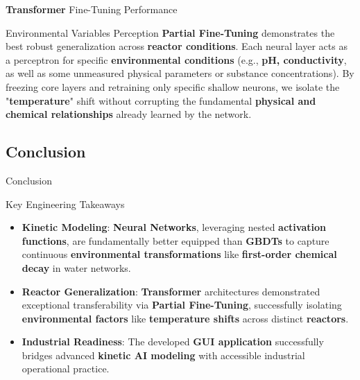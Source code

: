 \documentclass[xcolor=dvipsnames]{beamer}
\begin{document}
\begin{frame}{\textbf{Transformer} Fine-Tuning Performance}
  \footnotesize
  \begin{table}
      \centering
      \caption{MSE of Fine-Tuning Strategies on $35^{\circ}\text{C}$ Datasets}
  \end{table}
  \vspace{-0.3cm}
  \begin{block}{Environmental Variables Perception}
      \footnotesize
      \textbf{Partial Fine-Tuning} demonstrates the best robust generalization across \textbf{reactor conditions}. Each neural layer acts as a perceptron for specific \textbf{environmental conditions} (e.g., \textbf{pH, conductivity}, as well as some unmeasured physical parameters or substance concentrations). By freezing core layers and retraining only specific shallow neurons, we isolate the "\textbf{temperature}" shift without corrupting the fundamental \textbf{physical and chemical relationships} already learned by the network.
  \end{block}
\end{frame}

\subsection{Conclusion}
\begin{frame}{Conclusion}
  \begin{block}{Key Engineering Takeaways}
      \begin{itemize}
          \item \textbf{Kinetic Modeling}: \textbf{Neural Networks}, leveraging nested \textbf{activation functions}, are fundamentally better equipped than \textbf{GBDTs} to capture continuous \textbf{environmental transformations} like \textbf{first-order chemical decay} in water networks.
          \item \textbf{Reactor Generalization}: \textbf{Transformer} architectures demonstrated exceptional transferability via \textbf{Partial Fine-Tuning}, successfully isolating \textbf{environmental factors} like \textbf{temperature shifts} across distinct \textbf{reactors}.
          \item \textbf{Industrial Readiness}: The developed \textbf{GUI application} successfully bridges advanced \textbf{kinetic AI modeling} with accessible industrial operational practice.
      \end{itemize}
  \end{block}
\end{frame}
\end{document}
